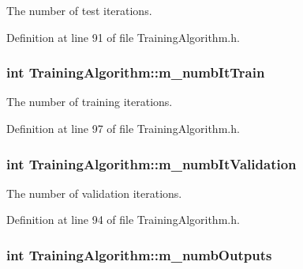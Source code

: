 The number of test iterations. 



Definition at line 91 of file Training\+Algorithm.\+h.

\subsubsection[{\texorpdfstring{m\+\_\+numb\+It\+Train}{m_numbItTrain}}]{\setlength{\rightskip}{0pt plus 5cm}int Training\+Algorithm\+::m\+\_\+numb\+It\+Train\hspace{0.3cm}{\ttfamily [private]}}\hypertarget{classTrainingAlgorithm_ae41346aa8b69752db8db8a6ebbaeb375}{}\label{classTrainingAlgorithm_ae41346aa8b69752db8db8a6ebbaeb375}


The number of training iterations. 



Definition at line 97 of file Training\+Algorithm.\+h.

\subsubsection[{\texorpdfstring{m\+\_\+numb\+It\+Validation}{m_numbItValidation}}]{\setlength{\rightskip}{0pt plus 5cm}int Training\+Algorithm\+::m\+\_\+numb\+It\+Validation\hspace{0.3cm}{\ttfamily [private]}}\hypertarget{classTrainingAlgorithm_accfc8c76b580d4beb2c4a153ee2758da}{}\label{classTrainingAlgorithm_accfc8c76b580d4beb2c4a153ee2758da}


The number of validation iterations. 



Definition at line 94 of file Training\+Algorithm.\+h.

\subsubsection[{\texorpdfstring{m\+\_\+numb\+Outputs}{m_numbOutputs}}]{\setlength{\rightskip}{0pt plus 5cm}int Training\+Algorithm\+::m\+\_\+numb\+Outputs\hspace{0.3cm}{\ttfamily [private]}}\hypertarget{classTrainingAlgorithm_ad9c37bc8f0a93867bbb506a1dc2310f4}{}\label{classTrainingAlgorithm_ad9c37bc8f0a93867bbb506a1dc2310f4}


